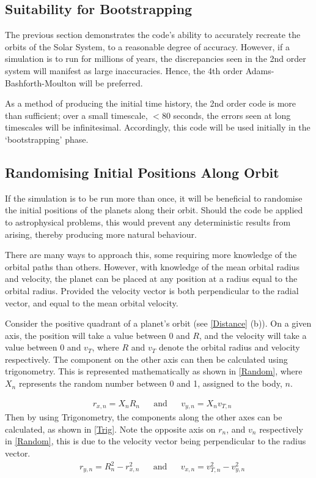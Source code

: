 \documentclass[a4paper,10pt]{article}
\begin{document}
\subsection{Suitability for Bootstrapping}\label{Suitable}

The previous section demonstrates the code's ability to accurately recreate the orbits of the Solar System, to a reasonable degree of accuracy. However, if a simulation is to run for millions of years, the discrepancies seen in the 2nd order system will manifest as large inaccuracies. Hence, the 4th order Adams-Bashforth-Moulton will be preferred.

As a method of producing the initial time history, the 2nd order code is more than sufficient; over a small timescale, $<80$ seconds, the errors seen at long timescales will be infinitesimal. Accordingly, this code will be used initially in the `bootstrapping' phase.   

\subsection{Randomising Initial Positions Along Orbit}

If the simulation is to be run more than once, it will be beneficial to randomise the initial positions of the planets along their orbit. Should the code be applied to astrophysical problems, this would prevent any deterministic results from arising, thereby producing more natural behaviour. 

There are many ways to approach this, some requiring more knowledge of the orbital paths than others. However, with knowledge of the mean orbital radius and velocity, the planet can be placed at any position at a radius equal to the orbital radius. Provided the velocity vector is both perpendicular to the radial vector, and equal to the mean orbital velocity. 

Consider the positive quadrant of a planet's orbit (see \cref{Distance} (b)). On a given axis, the position will take a value between 0 and $R$, and the velocity will take a value between 0 and $v_T$, where $R$ and $v_T$ denote the orbital radius and velocity respectively. The component on the other axis can then be calculated using trigonometry. This is represented mathematically as shown in \cref{Random}, where $X_n$ represents the random number between 0 and 1, assigned to the body, $n$.

\begin{align}\label{Random}
&r_{x,n} = X_n R_n&
&\text{and}&
&v_{y,n} = X_n v_{T,n}
\end{align}
Then by using Trigonometry, the components along the other axes can be calculated, as shown in \cref{Trig}. Note the opposite axis on $r_n$, and $v_n$ respectively in \cref{Random}, this is due to the velocity vector being perpendicular to the radius vector.
\begin{align}\label{Trig}
&r_{y,n} = R_n^2 - r_{x,n}^2&
&\text{and}&
&v_{x,n} = v_{T,n}^2 - v_{y,n}^2
\end{align}
\end{document}
